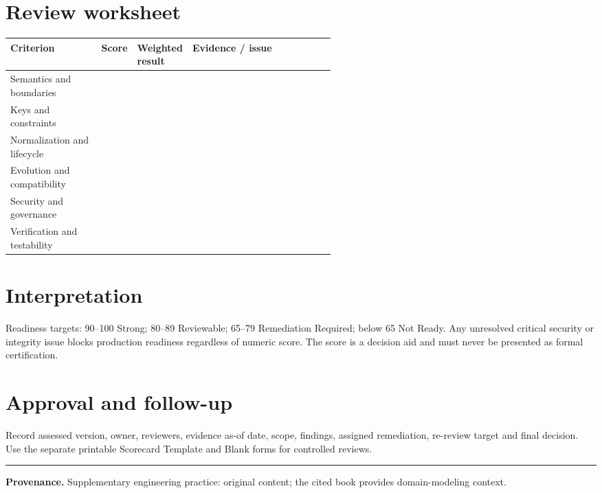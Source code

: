 \documentclass[11pt,letterpaper]{article}
\begin{document}
\section{Review worksheet}
\begin{tabularx}{\linewidth}{@{}>{\raggedright\arraybackslash}p{0.28\linewidth} >{\raggedright\arraybackslash}p{0.1\linewidth} >{\raggedright\arraybackslash}p{0.17\linewidth}>{\raggedright\arraybackslash}X@{}}
\toprule
\textbf{Criterion} & \textbf{Score} & \textbf{Weighted result} & \textbf{Evidence / issue} \\ 
\midrule
Semantics and boundaries &  &  &  \\ 
Keys and constraints &  &  &  \\ 
Normalization and lifecycle &  &  &  \\ 
Evolution and compatibility &  &  &  \\ 
Security and governance &  &  &  \\ 
Verification and testability &  &  &  \\ 
\bottomrule
\end{tabularx}

\section{Interpretation}
Readiness targets: 90--100 Strong; 80--89 Reviewable; 65--79 Remediation Required; below 65 Not Ready. Any unresolved critical security or integrity issue blocks production readiness regardless of numeric score. The score is a decision aid and must never be presented as formal certification.


\section{Approval and follow-up}
Record assessed version, owner, reviewers, evidence as-of date, scope, findings, assigned remediation, re-review target and final decision. Use the separate printable Scorecard Template and Blank forms for controlled reviews.


\vfill
\hrule
{\footnotesize\textbf{Provenance.} Supplementary engineering practice: original content; the cited book provides domain-modeling context.}
\end{document}
